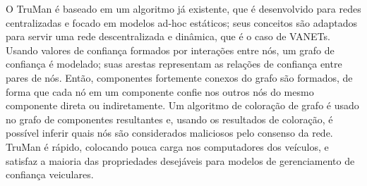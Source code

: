 \begin{resumo}
O TruMan é baseado em um algoritmo já existente, que é desenvolvido para redes centralizadas e focado em modelos ad-hoc estáticos; seus conceitos são adaptados para servir uma rede descentralizada e dinâmica, que é o caso de VANETs.
Usando valores de confiança formados por interações entre nós, um grafo de confiança é modelado; suas arestas representam as relações de confiança entre pares de nós.
Então, componentes fortemente conexos do grafo são formados, de forma que cada nó em um componente confie nos outros nós do mesmo componente direta ou indiretamente.
Um algoritmo de coloração de grafo é usado no grafo de componentes resultantes e, usando os resultados de coloração, é possível inferir quais nós são considerados maliciosos pelo consenso da rede.
TruMan é rápido, colocando pouca carga nos computadores dos veículos, e satisfaz a maioria das propriedades desejáveis para modelos de gerenciamento de confiança veiculares.

\end{resumo}

